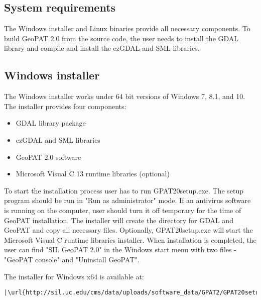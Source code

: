 \subsection{System requirements}

The Windows installer and Linux binaries provide all necessary components. 
To build GeoPAT 2.0 from the source code, the user needs to install the GDAL library and compile and install the ezGDAL and SML libraries.

\subsection{Windows installer}
The Windows installer works under 64 bit versions of Windows 7, 8.1, and 10.
The installer provides four components:
\begin{itemize}
  \item{GDAL library package}
  \item{ezGDAL and SML libraries}
  \item{GeoPAT 2.0 software}
  \item{Microsoft Visual C 13 runtime libraries (optional)}
\end{itemize}
To start the installation process user has to run GPAT20setup.exe.
The setup program should be run in "Run as administrator" mode.
If an antivirus software is running on the computer, user should turn it off temporary for the time of GeoPAT installation.
The installer will create the directory for GDAL and GeoPAT and copy all necessary files.
Optionally, GPAT20setup.exe will start the Microsoft Visual C runtime libraries installer.
When installation is completed, the user can find "SIL GeoPAT 2.0" in the Windows start menu with two files - "GeoPAT console" and "Uninstall GeoPAT".

The installer for Windows x64 is available at:

\begin{lstlisting}[escapechar=|]
|\url{http://sil.uc.edu/cms/data/uploads/software_data/GPAT2/GPAT20setup.exe}|
\end{lstlisting}

